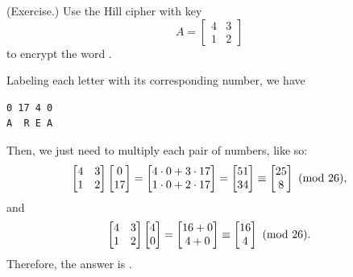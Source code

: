 \documentclass[letterpaper]{article}
\newcommand{\0}{\mathbf{0}}
\begin{document}
\begin{mdframed}
    (Exercise.) Use the Hill cipher with key \[A = \begin{bmatrix}
        4 & 3 \\ 1 & 2
    \end{bmatrix}\] to encrypt the word . 

    \begin{mdframed}
        Labeling each letter with its corresponding number, we have 
        \begin{mdframed}
            \begin{verbatim}
0 17 4 0
A  R E A\end{verbatim}
        \end{mdframed}
        Then, we just need to multiply each pair of numbers, like so: 
        \[\begin{bmatrix}
            4 & 3 \\ 1 & 2
        \end{bmatrix} \begin{bmatrix}
            0 \\ 17
        \end{bmatrix} = \begin{bmatrix}
            4 \cdot 0 + 3 \cdot 17 \\ 
            1 \cdot 0 + 2 \cdot 17
        \end{bmatrix} = \begin{bmatrix}
            51 \\ 
            34 
        \end{bmatrix} \equiv \begin{bmatrix}
            25 \\ 
            8
        \end{bmatrix} \ (\mathrm{mod}\ 26),\]
        and 
        \[\begin{bmatrix}
            4 & 3 \\ 1 & 2 
        \end{bmatrix} \begin{bmatrix}
            4 \\ 0
        \end{bmatrix} = \begin{bmatrix}
            16 + 0 \\ 
            4 + 0
        \end{bmatrix} \equiv \begin{bmatrix}
            16 \\ 4
        \end{bmatrix} \ (\mathrm{mod}\ 26).\] Therefore, the answer is .
    \end{mdframed}
\end{mdframed}
\end{document}
